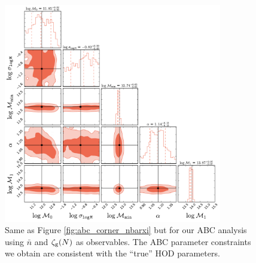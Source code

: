 \documentclass[fleqn,usenatbib]{mnras}
\begin{document}
\begin{figure}
\includegraphics[width=0.85\textwidth]{figs/paper_ABCcorner_nbargmf.pdf}
\caption{\label{fig:abc_corner_nbargmf}Same as Figure \ref{fig:abc_corner_nbarxi} but for our ABC analysis using $\bar{n}$ and $\mathcal{\zeta}_{\rm g}(N)$ as observables. The ABC parameter constraints we obtain are
consistent with the ``true'' HOD parameters.}
\end{figure}
\end{document}
